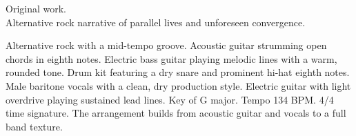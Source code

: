 

\begin{notes}
Original work.\\
Alternative rock narrative of parallel lives and unforeseen convergence.
\end{notes}

\begin{style}
Alternative rock with a mid-tempo groove. %
Acoustic guitar strumming open chords in eighth notes. %
Electric bass guitar playing melodic lines with a warm, rounded tone. %
Drum kit featuring a dry snare and prominent hi-hat eighth notes. %
Male baritone vocals with a clean, dry production style. %
Electric guitar with light overdrive playing sustained lead lines. %
Key of G major. %
Tempo 134 BPM. %
4/4 time signature. %
The arrangement builds from acoustic guitar and vocals to a full band texture.
\end{style}

